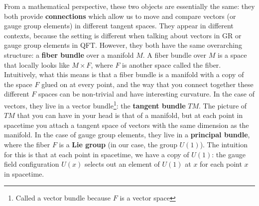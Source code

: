 \documentclass[12pt, oneside]{article}   	%
\theoremstyle{definition}
\begin{document}
\begin{itemize}
\begin{answerbox}
	From a mathematical perspective, these two objects are essentially the same: they both provide \textbf{connections} which allow us to move and compare vectors (or gauge group elements) in different tangent spaces. They appear in different contexts, because the setting is different when talking about vectors in GR or gauge group elements in QFT. However, they both have the same overarching structure: a \textbf{fiber bundle} over a manifold $M$. A fiber bundle over $M$ is a space that locally looks like $M\times F$, where $F$ is another space called the fiber. Intuitively, what this means is that a fiber bundle is a manifold with a copy of the space $F$ glued on at every point, and the way that you connect together these different $F$ spaces can be non-trivial and have interesting curvature. In the case of vectors, they live in a vector bundle\footnote{Called a vector bundle because $F$ is a vector space}: the \textbf{tangent bundle} $TM$. The picture of $TM$ that you can have in your head is that of a manifold, but at each point in spacetime you attach a tangent space of vectors with the same dimension as the manifold. In the case of gauge group elements, they live in a \textbf{principal bundle}, where the fiber $F$ is a \textbf{Lie group} (in our case, the group $U(1)$). The intuition for this is that at each point in spacetime, we have a copy of $U(1)$: the gauge field configuration $U(x)$ selects out an element of $U(1)$ at $x$ for each point $x$ in spacetime. 
	\end{answerbox}

\end{itemize}
\end{document}
